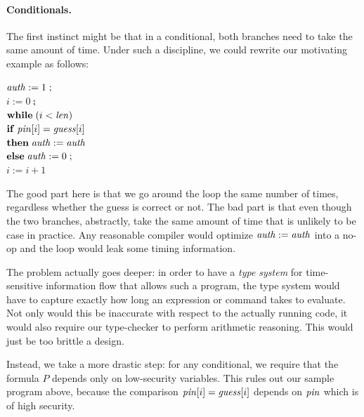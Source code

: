 \documentclass[11pt]{article}
\begin{document}
\paragraph{Conditionals.}  The first instinct might be that in a conditional,
both branches need to take the same amount of time.  Under such a discipline,
we could rewrite our motivating example as follows:
\begin{tabbing}
  \quad $\mathit{auth} := 1 \mathrel{;}$ \\
  \quad $i := 0 \semi$ \\
  \quad $\mathbf{while}\; (i < \mathit{len})$ \\
  \qquad $\mathbf{if}\; \mathit{pin}[i] = \mathit{guess}[i]$ \\
  \qquad $\mathbf{then}\; \mathit{auth} := \mathit{auth}$ \\
  \qquad $\mathbf{else}\; \mathit{auth} := 0 \mathrel{;}$ \\
  \qquad $i := i+1$
\end{tabbing}
The good part here is that we go around the loop the same number of times,
regardless whether the guess is correct or not.  The bad part is that
even though the two branches, abstractly, take the same amount of time
that is unlikely to be case in practice.  Any reasonable compiler would
optimize $\mathit{auth} := \mathit{auth}$ into a no-op and the loop would leak
some timing information.

The problem actually goes deeper: in order to have a \emph{type system} for
time-sensitive information flow that allows such a program, the type system
would have to capture exactly how long an expression or command takes to
evaluate.  Not only would this be inaccurate with respect to the actually
running code, it would also require our type-checker to perform arithmetic
reasoning.  This would just be too brittle a design.

Instead, we take a more drastic step: for any conditional, we require that the
formula $P$ depends only on low-security variables.  This rules out our sample
program above, because the comparison $\mathit{pin}[i] = \mathit{guess}[i]$ depends on
$\mathit{pin}$ which is of high security.
\end{document}

